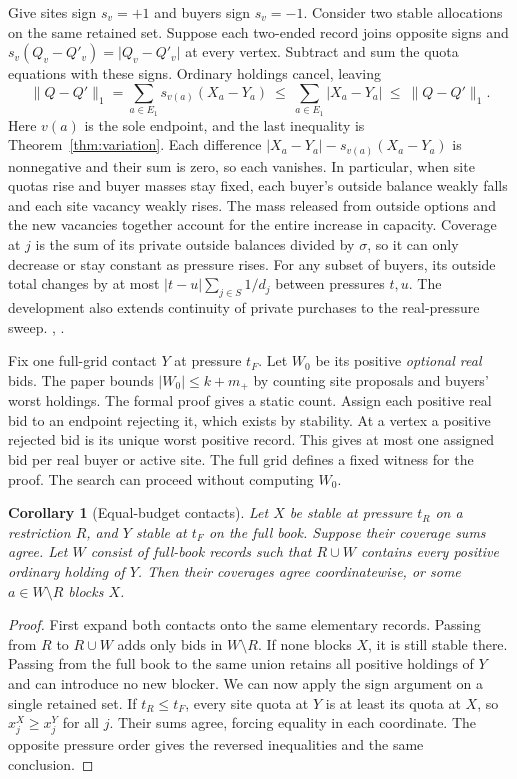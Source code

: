 \documentclass[11pt,letterpaper]{article}
\newcommand{\code}[1]{\textnormal{\texttt{\detokenize{#1}}}}
\newcommand{\baseurl}{https://github.com/robbiemu/bayesian-simple-security-games/blob/75bc25c2ddfac1813064434a3165b3ddd1a1f63d}
\newcommand{\decl}[3]{\href{\baseurl/lean/#1.lean\#L#2}{\code{#3}}}
\newcommand{\abs}[1]{\lvert#1\rvert}
\newcommand{\normone}[1]{\lVert#1\rVert_1}
\newtheorem{corollary}[theorem]{Corollary}
\begin{document}
Give sites sign $s_v=+1$ and buyers sign $s_v=-1$. Consider two stable
allocations on the same retained set. Suppose each two-ended record joins opposite signs and
$s_v(Q_v-Q'_v)=\abs{Q_v-Q'_v}$ at every vertex. Subtract and sum the quota
equations with these signs. Ordinary holdings cancel, leaving
\[
  \normone{Q-Q'}=\sum_{a\in E_1}s_{v(a)}(X_a-Y_a)
       \ \le\ \sum_{a\in E_1}|X_a-Y_a|\ \le\ \normone{Q-Q'}.
\]
Here $v(a)$ is the sole endpoint, and the last inequality is
Theorem~\ref{thm:variation}. Each difference
$|X_a-Y_a|-s_{v(a)}(X_a-Y_a)$ is nonnegative and their sum is zero,
so each vanishes. In particular, when site quotas rise and
buyer masses stay fixed, each buyer's outside balance weakly falls and
each site vacancy weakly rises. The mass released from outside options
and the new vacancies together account for the entire increase in capacity.
Coverage at $j$ is the sum of its private outside balances divided
by $\sigma$, so it can only decrease or stay constant as pressure rises.
For any subset of buyers, its outside total changes by at most
$|t-u|\sum_{j\in S}1/d_j$ between pressures $t,u$. The development also
extends continuity of private purchases to the real-pressure sweep.
\decl{Kintali/StableAllocation}{259}{Market.signed_slack_change},
\decl{Kintali/QuotaSweep/RealContinuity}{105}{privatePurchases_regular}.

Fix one full-grid contact $Y$ at pressure $t_F$. Let $W_0$ be its positive
\emph{optional real} bids. The paper bounds $|W_0|\le k+m_+$ by counting
site proposals and buyers' worst holdings. The formal proof gives a static
count. Assign each positive real bid to an endpoint rejecting it, which
exists by stability. At a vertex a positive rejected bid is its unique
worst positive record. This gives at most one assigned bid per real buyer
or active site. The full grid defines a fixed witness for the proof.
The search can proceed without computing $W_0$.
\cite[(5), Lemma~6]{kintali}

\begin{corollary}[Equal-budget contacts]\label{cor:union}
Let $X$ be stable at pressure $t_R$ on a restriction $R$, and $Y$ stable
at $t_F$ on the full book. Suppose their coverage sums agree.
Let $W$ consist of full-book records such that $R\cup W$ contains every
positive ordinary holding of $Y$. Then their coverages agree
coordinatewise, or some $a\in W\setminus R$ blocks $X$.
\end{corollary}
\begin{proof}
First expand both contacts onto the same elementary records. Passing from
$R$ to $R\cup W$ adds only bids in $W\setminus R$. If none blocks $X$,
it is still stable there. Passing from the full book to the same union
retains all positive holdings of $Y$ and can introduce no new blocker.
We can now apply the sign argument on a single retained set. If
$t_R\le t_F$, every site quota at $Y$ is at least its quota at $X$, so
$x^X_j\ge x^Y_j$ for all $j$. Their sums agree, forcing equality in each
coordinate. The opposite pressure order gives the reversed inequalities
and the same conclusion.
\end{proof}
\end{document}
